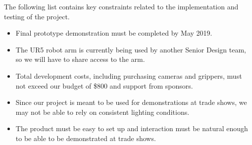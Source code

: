 The following list contains key constraints related to the implementation and testing of the project.

\begin{itemize}
  \item Final prototype demonstration must be completed by May 2019.
  \item The UR5 robot arm is currently being used by another Senior Design team, so we will have to share access to the arm.
  \item Total development costs, including purchasing cameras and grippers, must not exceed our budget of \$800 and support from sponsors.
  \item Since our project is meant to be used for demonstrations at trade shows, we may not be able to rely on consistent lighting conditions.
  \item The product must be easy to set up and interaction must be natural enough to be able to be demonstrated at trade shows.
\end{itemize}
